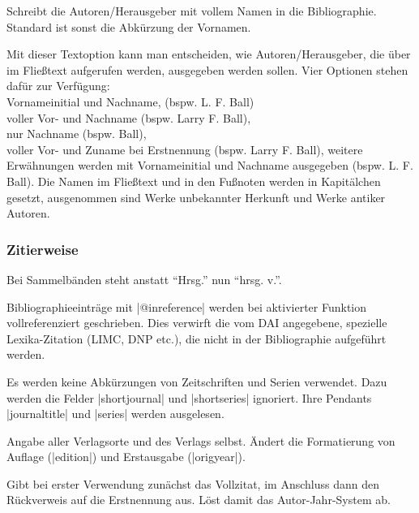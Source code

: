 \documentclass[a4paper,10pt,ngerman]{ltxdoc}
\begin{document}
  Schreibt die Autoren/Herausgeber mit vollem Namen in die Bibliographie. Standard ist sonst die Abkürzung der Vornamen. 

Mit dieser Textoption kann man entscheiden, 
wie Autoren/Herausgeber, die über \- im Fließtext aufgerufen werden,
ausgegeben werden sollen.
Vier Optionen stehen dafür zur Verfügung:\\
Vornameinitial und Nachname, (bspw. L. F. Ball)\\
voller Vor- und Nachname (bspw. Larry F. Ball),\\
nur Nachname (bspw. Ball), \\
voller Vor- und Zuname bei Erstnennung (bspw. Larry F. Ball), 
weitere Erwähnungen werden mit Vornameinitial und Nachname ausgegeben (bspw. L. F. Ball).
  Die Namen im Fließtext und in den Fußnoten werden in Kapitälchen gesetzt, ausgenommen sind Werke unbekannter Herkunft und Werke antiker Autoren.

\subsubsection{Zitierweise}

  Bei Sammelbänden steht anstatt \enquote{Hrsg.} nun \enquote{hrsg. v.}.

  Bibliographieeinträge mit |@inreference| werden bei aktivierter Funktion vollreferenziert geschrieben. 
Dies verwirft die vom DAI angegebene, spezielle Lexika-Zitation (LIMC, DNP etc.), die  nicht in der Bibliographie aufgeführt werden. 

  Es werden keine Abkürzungen von Zeitschriften und Serien verwendet. Dazu werden die Felder |shortjournal| und |shortseries| ignoriert. Ihre Pendants |journaltitle| und |series| werden ausgelesen.

  Angabe aller Verlagsorte und des Verlags selbst. Ändert die Formatierung von Auflage (|edition|) und Erstausgabe (|origyear|).

  Gibt bei erster Verwendung zunächst das Vollzitat, im Anschluss dann den Rückverweis auf die Erstnennung aus. Löst damit das Autor-Jahr-System ab. 
\end{document}
